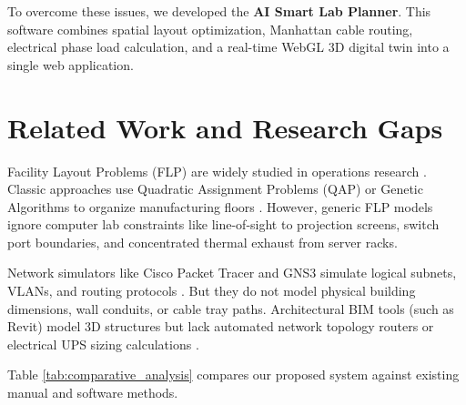 \documentclass[conference]{IEEEtran}
\begin{document}
To overcome these issues, we developed the \textbf{AI Smart Lab Planner}. This software combines spatial layout optimization, Manhattan cable routing, electrical phase load calculation, and a real-time WebGL 3D digital twin into a single web application.

\section{Related Work and Research Gaps}
Facility Layout Problems (FLP) are widely studied in operations research \cite{ref_facility_layout, ref_flp_survey}. Classic approaches use Quadratic Assignment Problems (QAP) or Genetic Algorithms to organize manufacturing floors \cite{ref_genetic_arch}. However, generic FLP models ignore computer lab constraints like line-of-sight to projection screens, switch port boundaries, and concentrated thermal exhaust from server racks.

Network simulators like Cisco Packet Tracer and GNS3 simulate logical subnets, VLANs, and routing protocols \cite{ref_packet_tracer, ref_gns3}. But they do not model physical building dimensions, wall conduits, or cable tray paths. Architectural BIM tools (such as Revit) model 3D structures but lack automated network topology routers or electrical UPS sizing calculations \cite{ref_cad_review, ref_bim}.

Table \ref{tab:comparative_analysis} compares our proposed system against existing manual and software methods.
\end{document}
